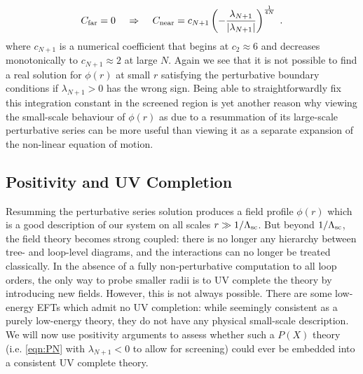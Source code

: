 \documentclass[11pt]{article}
\begin{document}
\begin{align}
C_{\rm far} = 0 \;\;\;\; \Rightarrow \;\;\;\; 
C_{\rm near} = c_{N+1} \left( - \frac{\lambda_{N+1} }{|\lambda_{N+1}|} \right)^{\frac{1}{4N}}  \; .
\label{eqn:Cnear}
\end{align}
where $c_{N+1}$ is a numerical coefficient that begins at $c_2  \approx 6$ and decreases monotonically to $c_{N+1} \approx 2$ at large $N$. 
Again we see that it is not possible to find a real solution for $\phi(r)$ at small $r$ satisfying the perturbative boundary conditions if $\lambda_{N+1} > 0$ has the wrong sign. 
Being able to straightforwardly fix this integration constant in the screened region is yet another reason why viewing the small-scale behaviour of $\phi (r)$ as due to a resummation of its large-scale perturbative series can be more useful than viewing it as a separate expansion of the non-linear equation of motion.  


\subsection{Positivity and UV Completion}
\label{sec:PX_positivity}


Resumming the perturbative series solution produces a field profile $\phi (r)$ which is a good description of our system on all scales $r \gg 1/\Lambda_{\rm sc}$. But beyond $1/\Lambda_{\rm sc}$, the field theory becomes strong coupled: there is no longer any hierarchy between tree- and loop-level diagrams,  and the interactions can no longer be treated classically. 
In the absence of a fully non-perturbative computation to all loop orders, the only way to probe smaller radii is to UV complete the theory by introducing new fields. 
However, this is not always possible. There are some low-energy EFTs which admit no UV completion: while seemingly consistent as a purely low-energy theory, they do not have any physical small-scale description. 
We will now use positivity arguments to assess whether such a $P(X)$ theory (i.e. \eqref{eqn:PN} with $\lambda_{N+1} < 0$ to  allow for screening) could ever be embedded into a consistent UV complete theory.
\end{document}
